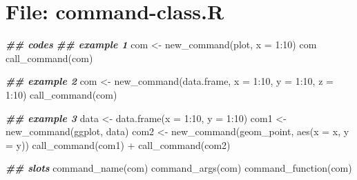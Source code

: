 \documentclass[
]{article}
\newenvironment{Shaded}{\begin{snugshade}}{\end{snugshade}}
\newcommand{\AttributeTok}[1]{\textcolor[rgb]{0.77,0.63,0.00}{#1}}
\newcommand{\DecValTok}[1]{\textcolor[rgb]{0.00,0.00,0.81}{#1}}
\newcommand{\DocumentationTok}[1]{\textcolor[rgb]{0.56,0.35,0.01}{\textbf{\textit{#1}}}}
\newcommand{\FunctionTok}[1]{\textcolor[rgb]{0.00,0.00,0.00}{#1}}
\newcommand{\NormalTok}[1]{#1}
\newcommand{\OtherTok}[1]{\textcolor[rgb]{0.56,0.35,0.01}{#1}}
\newcommand{\SpecialCharTok}[1]{\textcolor[rgb]{0.00,0.00,0.00}{#1}}
\newcommand{\StringTok}[1]{\textcolor[rgb]{0.31,0.60,0.02}{#1}}
\begin{document}
\begin{Shaded}
\end{Shaded}

\hypertarget{file-command-class.r}{%
\section{File: command-class.R}\label{file-command-class.r}}

\begin{Shaded}
\begin{Highlighting}[]
\DocumentationTok{\#\# codes}
\DocumentationTok{\#\# example 1}
\NormalTok{com }\OtherTok{\textless{}{-}} \FunctionTok{new\_command}\NormalTok{(plot, }\AttributeTok{x =} \DecValTok{1}\SpecialCharTok{:}\DecValTok{10}\NormalTok{)}
\NormalTok{com}
\FunctionTok{call\_command}\NormalTok{(com)}

\DocumentationTok{\#\# example 2}
\NormalTok{com }\OtherTok{\textless{}{-}} \FunctionTok{new\_command}\NormalTok{(data.frame, }\AttributeTok{x =} \DecValTok{1}\SpecialCharTok{:}\DecValTok{10}\NormalTok{, }\AttributeTok{y =} \DecValTok{1}\SpecialCharTok{:}\DecValTok{10}\NormalTok{, }\AttributeTok{z =} \DecValTok{1}\SpecialCharTok{:}\DecValTok{10}\NormalTok{)}
\FunctionTok{call\_command}\NormalTok{(com)}

\DocumentationTok{\#\# example 3}
\NormalTok{data }\OtherTok{\textless{}{-}} \FunctionTok{data.frame}\NormalTok{(}\AttributeTok{x =} \DecValTok{1}\SpecialCharTok{:}\DecValTok{10}\NormalTok{, }\AttributeTok{y =} \DecValTok{1}\SpecialCharTok{:}\DecValTok{10}\NormalTok{)}
\NormalTok{com1 }\OtherTok{\textless{}{-}} \FunctionTok{new\_command}\NormalTok{(ggplot, data)}
\NormalTok{com2 }\OtherTok{\textless{}{-}} \FunctionTok{new\_command}\NormalTok{(geom\_point, }\FunctionTok{aes}\NormalTok{(}\AttributeTok{x =}\NormalTok{ x, }\AttributeTok{y =}\NormalTok{ y))}
\FunctionTok{call\_command}\NormalTok{(com1) }\SpecialCharTok{+} \FunctionTok{call\_command}\NormalTok{(com2)}

\DocumentationTok{\#\# slots}
\FunctionTok{command\_name}\NormalTok{(com)}
\FunctionTok{command\_args}\NormalTok{(com)}
\FunctionTok{command\_function}\NormalTok{(com)}
\end{Highlighting}
\end{Shaded}
\end{document}
